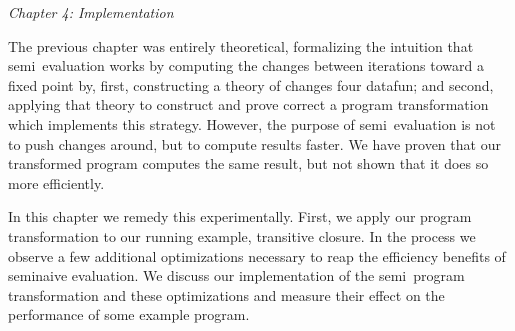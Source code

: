 \emph{Chapter 4: Implementation}

\newcommand\deep{\mathvar{dp}}

The previous chapter was entirely theoretical, formalizing the intuition that
semi\naive\ evaluation works by computing the changes between iterations toward
a fixed point by, first, constructing a theory of changes four datafun; and
second, applying that theory to construct and prove correct a program
transformation which implements this strategy. However, the purpose of
semi\naive\ evaluation is not to push changes around, but to compute results
faster. We have proven that our transformed program computes the same result,
but not shown that it does so more efficiently.

In this chapter we remedy this experimentally. First, we apply our program
transformation to our running example, transitive closure. In the process we
observe a few additional optimizations necessary to reap the efficiency
benefits of seminaive evaluation. We discuss our implementation of the
semi\naive\ program transformation and these optimizations and measure their
effect on the performance of some example program.




